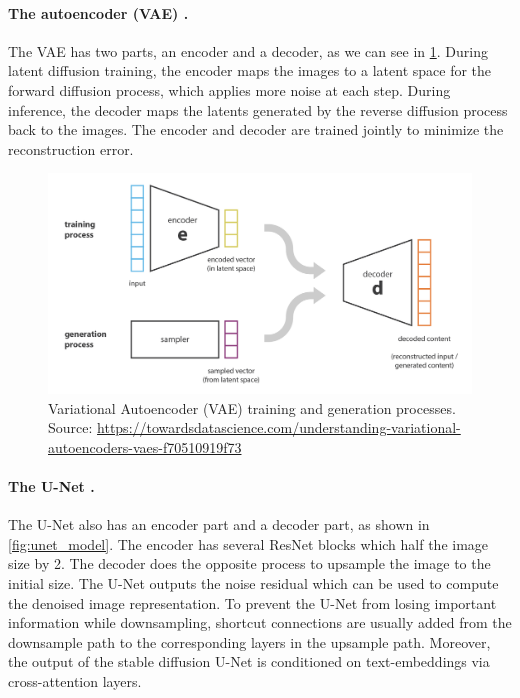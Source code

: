 \paragraph{The autoencoder (VAE) \cite{kingma2013auto}.} The VAE has two parts, an encoder and a decoder, as we can see in \cref{fig:vae}. During latent diffusion training, the encoder maps the images to a latent space for the forward diffusion process, which applies more noise at each step. During inference, the decoder maps the latents generated by the reverse diffusion process back to the images. The encoder and decoder are trained jointly to minimize the reconstruction error.

\begin{figure}[ht]
    \centering
    \includegraphics[width=\linewidth]{images/vae.png}
    \caption{Variational Autoencoder (VAE) training and generation processes. Source: \url{https://towardsdatascience.com/understanding-variational-autoencoders-vaes-f70510919f73}}
    \label{fig:vae}
\end{figure}

\paragraph{The U-Net \cite{ronneberger2015u}.} The U-Net also has an encoder part and a decoder part, as shown in \cref{fig:unet_model}. The encoder has several ResNet blocks which half the image size by 2. The decoder does the opposite process to upsample the image to the initial size. The U-Net outputs the noise residual which can be used to compute the denoised image representation. To prevent the U-Net from losing important information while downsampling, shortcut connections are usually added from the downsample path to the corresponding layers in the upsample path. Moreover, the output of the stable diffusion U-Net is conditioned on text-embeddings via cross-attention layers.

